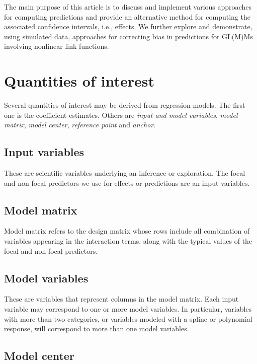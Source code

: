 \documentclass[10pt,letterpaper]{article}
\begin{document}
The main purpose of this article is to discuss and implement various approaches for computing predictions and provide an alternative method for computing the associated confidence intervals, i.e., effects. We further explore and demonstrate, using simulated data, approaches for correcting bias in predictions for GL(M)Ms involving nonlinear link functions.


\section*{Quantities of interest}

Several quantities of interest may be derived from regression models. The first one is the coefficient estimates. Others are \emph{input and model variables}, \emph{model matrix}, \emph{model center}, \emph{reference point} and \emph{anchor}.

\subsection*{Input variables}

These are scientific variables underlying an inference or exploration. The focal and non-focal predictors we use for effects or predictions are an input variables.

\subsection*{Model matrix}

Model matrix refers to the design matrix whose rows include all combination of variables appearing in the interaction terms, along with the typical values of the focal and non-focal predictors. 

\subsection*{Model variables}

These are variables that represent columns in the model matrix. Each input variable may correspond to one or more model variables. In particular, variables with more than two categories, or variables modeled with a spline or polynomial response, will correspond to more than one model variables.

\subsection*{Model center} 
\end{document}
